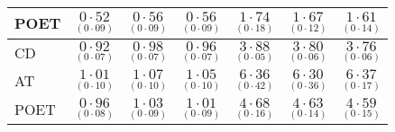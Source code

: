 \documentclass[11pt,oneside]{amsart}
\begin{document}
\begin{table}[htbp!]
\begin{multicols}{7}
\begin{tabular}{|p{1.92cm}|p{1.92cm}|p{1.92cm}|p{1.92cm}|p{1.92cm}|p{1.92cm}|p{1.92cm}|}
POET & ${\underset{(0\cdot09)}{0\cdot52}}$ & ${\underset{(0\cdot09)}{0\cdot56}}$ & ${\underset{(0\cdot09)}{0\cdot56}}$ & ${\underset{(0\cdot18)}{1\cdot74}}$ & ${\underset{(0\cdot12)}{1\cdot67}}$ & ${\underset{(0\cdot14)}{1\cdot61}}$ \\ 
\hline
\hline
CD & ${\underset{(0\cdot07)}{0\cdot92}}$ & ${\underset{(0\cdot07)}{0\cdot98}}$ & ${\underset{(0\cdot07)}{0\cdot96}}$ & ${\underset{(0\cdot05)}{3\cdot88}}$ & ${\underset{(0\cdot06)}{3\cdot80}}$ & ${\underset{(0\cdot06)}{3\cdot76}}$ \\  
AT & ${\underset{(0\cdot10)}{1\cdot01}}$ & ${\underset{(0\cdot10)}{1\cdot07}}$ & ${\underset{(0\cdot10)}{1\cdot05}}$ & ${\underset{(0\cdot42)}{6\cdot36}}$ & ${\underset{(0\cdot36)}{6\cdot30}}$ & ${\underset{(0\cdot17)}{6\cdot37}}$ \\ 
POET & ${\underset{(0\cdot08)}{0\cdot96}}$ & ${\underset{(0\cdot09)}{1\cdot03}}$ & ${\underset{(0\cdot09)}{1\cdot01}}$ & ${\underset{(0\cdot16)}{4\cdot68}}$ & ${\underset{(0\cdot14)}{4\cdot63}}$ & ${\underset{(0\cdot15)}{4\cdot59}}$ \\ 
\hline
\end{tabular}
\end{multicols}
\end{table}
\end{document}
